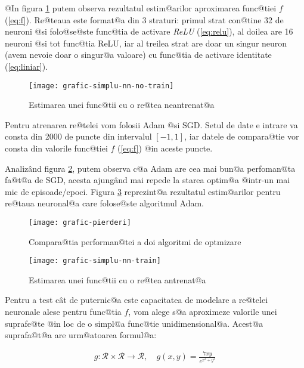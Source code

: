 @In figura \ref{fig:grafic-simplu-nn-no-train} putem observa rezultatul estim@arilor aproximarea func@tiei $f$ (\ref{eq:f}). Re@teaua este format@a din 3 straturi: primul strat con@tine 32 de neuroni @si folo@se@ste func@tia de activare \textsl{ReLU} (\ref{eq:relu}), al doilea are 16 neuroni @si tot func@tia ReLU, iar al treilea strat are doar un singur neuron (avem nevoie doar o singur@a valoare) cu func@tia de activare identitate (\ref{eq:liniar}).

\begin{figure}[h]
	\centering
	\texttt{[image: grafic-simplu-nn-no-train]}
	\caption{Estimarea unei func@tii cu o re@tea neantrenat@a}
	\label{fig:grafic-simplu-nn-no-train}
\end{figure}

Pentru atrenarea re@telei vom folosii Adam @si SGD. Setul de date e intrare va consta din 2000 de puncte din intervalul $[-1, 1]$, iar datele de compara@tie vor consta din valorile func@tiei $f$ (\ref{eq:f}) @in aceste puncte.

Analiz\^ and figura \ref{fig:grafic-pierderi}, putem observa c@a Adam are cea mai bun@a perfoman@ta fa@t@a de SGD, acesta ajung\^ and mai repede la starea optim@a @intr-un mai mic de episoade/epoci. Figura \ref{fig:grafic-simplu-nn-train} reprezint@a rezultatul estim@arilor pentru re@taua neuronal@a care folose@ste algoritmul Adam.
 
\begin{figure}[H]
	\centering
	\texttt{[image: grafic-pierderi]}
	\caption{Compara@tia performan@tei a doi algoritmi de optmizare}
	\label{fig:grafic-pierderi}
\end{figure}

\begin{figure}[H]
	\centering
	\texttt{[image: grafic-simplu-nn-train]}
	\caption{Estimarea unei func@tii cu o re@tea antrenat@a}
	\label{fig:grafic-simplu-nn-train}
\end{figure}

Pentru a test c\^ at de puternic@a este capacitatea de modelare a re@telei neuronale alese pentru func@tia $f$, vom alege s@a aproximeze valorile unei suprafe@te @in loc de o simpl@a func@tie unidimensional@a. Acest@a suprafa@t@a are urm@atoarea formul@a:

\begin{align} \label{eq:suprafata}
	g: \mathcal{R} \times \mathcal{R} \to \mathcal{R}, \quad
	g(x, y) = \displaystyle\frac{7xy}{e^{x^2 + y^2}}
\end{align} 

